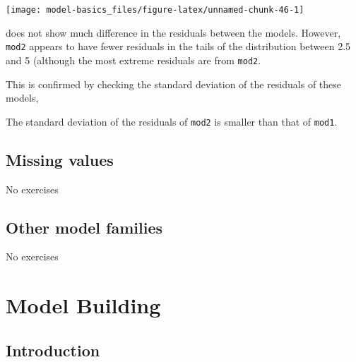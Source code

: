 \documentclass[]{book}
\newenvironment{Shaded}{\begin{snugshade}}{\end{snugshade}}
\newcommand{\CommentTok}[1]{\textcolor[rgb]{0.56,0.35,0.01}{\textit{#1}}}
\newcommand{\DataTypeTok}[1]{\textcolor[rgb]{0.13,0.29,0.53}{#1}}
\newcommand{\KeywordTok}[1]{\textcolor[rgb]{0.13,0.29,0.53}{\textbf{#1}}}
\newcommand{\NormalTok}[1]{#1}
\newcommand{\OperatorTok}[1]{\textcolor[rgb]{0.81,0.36,0.00}{\textbf{#1}}}
\newcommand{\StringTok}[1]{\textcolor[rgb]{0.31,0.60,0.02}{#1}}
\theoremstyle{plain}
\theoremstyle{remark}
\theoremstyle{definition}
\theoremstyle{definition}
\theoremstyle{definition}
\theoremstyle{remark}
\begin{document}
\begin{center}\texttt{[image: model-basics\_files/figure-latex/unnamed-chunk-46-1]} \end{center}

does not show much difference in the residuals between the models.
However, \texttt{mod2} appears to have fewer residuals in the tails of
the distribution between 2.5 and 5 (although the most extreme residuals
are from \texttt{mod2}.

This is confirmed by checking the standard deviation of the residuals of
these models,

\begin{Shaded}
\end{Shaded}

The standard deviation of the residuals of \texttt{mod2} is smaller than
that of \texttt{mod1}.

\hypertarget{missing-values-2}{%
\section{Missing values}\label{missing-values-2}}

No exercises

\hypertarget{other-model-families}{%
\section{Other model families}\label{other-model-families}}

No exercises

\hypertarget{model-building}{%
\chapter{Model Building}\label{model-building}}

\hypertarget{introduction-15}{%
\section{Introduction}\label{introduction-15}}
\end{document}
